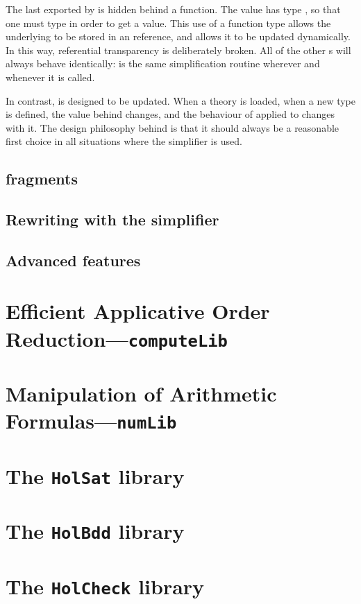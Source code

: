 The last \simpset{} exported by  is hidden behind a
function.  The  value has type , so
that one must type  in order to get a \simpset{} value.
This use of a function type allows the underlying \simpset{} to be
stored in an \ML{} reference, and allows it to be updated
dynamically.  In this way, referential transparency is deliberately
broken.  All of the other \simpset{}s will always behave identically:
 is the same simplification routine wherever
and whenever it is called.

In contrast,  is designed to be updated.  When a theory is
loaded, when a new type is defined, the value behind 
changes, and the behaviour of  applied to
 changes with it.  The design philosophy behind
 is that it should always be a reasonable first choice in
all situations where the simplifier is used.

\subsection{\Simpset{} fragments}

\subsection{Rewriting with the simplifier}
\label{sec:simplifier-rewriting}

\subsection{Advanced features}
\label{sec:advanced-simplifier}

\section{Efficient Applicative Order Reduction---\texttt{computeLib}}
\label{sec:computeLib}

\section{Manipulation of Arithmetic Formulas---\texttt{numLib}}
\label{sec:numLib}

\section{The \texttt{HolSat} library}\label{sec:HolSatLib}
\section{The \texttt{HolBdd} library}\label{sec:HolBddLib}
\section{The \texttt{HolCheck} library}\label{sec:HolCheckLib}


